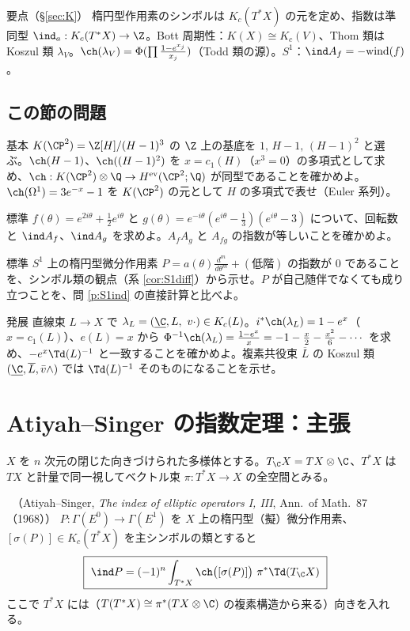 \begin{keybox}{要点（\S\ref{sec:K}）}
楕円型作用素のシンボルは $K_c(T^*X)$ の元を定め、指数は準同型 $\ind_a:K_c(T^*X)\to\Z$。Bott 周期性：$K(X)\cong K_c(V)$、Thom 類は Koszul 類 $\lambda_V$。$\ch(\lambda_V)=\Phi(\prod\frac{1-e^{x_j}}{x_j})$（Todd 類の源）。$S^1$：$\ind A_f=-\mathrm{wind}(f)$。
\end{keybox}
\subsection*{この節の問題}
\begin{prob}{基本}\label{p:KCP2}
$K(\CP^2)=\Z[H]/(H-1)^3$ の $\Z$ 上の基底を $1,\,H-1,\,(H-1)^2$ と選ぶ。$\ch(H-1)$、$\ch((H-1)^2)$ を $x=c_1(H)$（$x^3=0$）の多項式として求め、$\ch:K(\CP^2)\otimes\Q\to H^{\rm ev}(\CP^2;\Q)$ が同型であることを確かめよ。$\ch(\Omega^1)=3e^{-x}-1$ を $K(\CP^2)$ の元として $H$ の多項式で表せ（Euler 系列）。
\end{prob}
\begin{prob}{標準}\label{p:Toeplitz}
$f(\theta)=e^{2i\theta}+\frac12e^{i\theta}$ と $g(\theta)=e^{-i\theta}(e^{i\theta}-\frac13)(e^{i\theta}-3)$ について、回転数と $\ind A_f$、$\ind A_g$ を求めよ。$A_fA_g$ と $A_{fg}$ の指数が等しいことを確かめよ。
\end{prob}
\begin{prob}{標準}\label{p:diffS1}
$S^1$ 上の楕円型微分作用素 $P=a(\theta)\frac{d^m}{d\theta^m}+(\text{低階})$ の指数が 0 であることを、シンボル類の観点（系 \ref{cor:S1diff}）から示せ。$P$ が自己随伴でなくても成り立つことを、問 \ref{p:S1ind} の直接計算と比べよ。
\end{prob}
\begin{prob}{発展}\label{p:koszul}
直線束 $L\to X$ で $\lambda_L=(\underline\C,L,\ v\cdot)\in K_c(L)$。$i^*\ch(\lambda_L)=1-e^{x}$（$x=c_1(L)$）、$e(L)=x$ から $\Phi^{-1}\ch(\lambda_L)=\frac{1-e^x}x=-1-\frac x2-\frac{x^2}6-\cdots$ を求め、$-e^x\Td(L)^{-1}$ と一致することを確かめよ。複素共役束 $\overline L$ の Koszul 類 $(\underline\C,\overline L,\bar v\wedge)$ では $\Td(L)^{-1}$ そのものになることを示せ。
\end{prob}

\section{Atiyah--Singer の指数定理：主張}\label{sec:AS}
$X$ を $n$ 次元の閉じた向きづけられた多様体とする。$T_{\C}X=TX\otimes\C$、$T^*X$ は $TX$ と計量で同一視してベクトル束 $\pi:T^*X\to X$ の全空間とみる。
\begin{thm}\label{thm:AS}\tC\ （Atiyah--Singer, \emph{The index of elliptic operators I, III}, Ann.\ of Math.\ 87（1968））
$P:\Gamma(E^0)\to\Gamma(E^1)$ を $X$ 上の楕円型（擬）微分作用素、$[\sigma(P)]\in K_c(T^*X)$ を主シンボルの類とすると
\[
\boxed{\ \ind P=(-1)^n\int_{T^*X}\ch\bigl([\sigma(P)]\bigr)\ \pi^*\Td(T_{\C}X)\ }
\]
ここで $T^*X$ には（$T(T^*X)\cong\pi^*(TX\otimes\C)$ の複素構造から来る）向きを入れる。
\end{thm}
